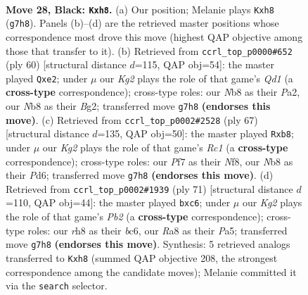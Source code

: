 \documentclass[11pt]{article}
\begin{document}
\clearpage

\begin{figure}[p]\centering
\begin{subfigure}{0.46\textwidth}\centering
\resizebox{\linewidth}{!}{%
\newchessgame
\chessboard[
  setfen={rn5R/pR1n1pk1/3p4/q2P2b1/4P1P1/2NQ4/4N3/4K3 b - - 0 28},
  showmover=false,
  pgfstyle=straightmove, color=movearrow, markmove={g7-h8}
]}
\caption{}
\end{subfigure}\hfill
\begin{subfigure}{0.46\textwidth}\centering
\resizebox{\linewidth}{!}{%
\newchessgame
\chessboard[
  setfen={3n4/p3q1kp/1p2npp1/8/4NP2/4P1P1/P3r1BP/3Q2K1 w - - 0 31},
  showmover=false,
  pgfstyle=straightmove, color=movearrow, markmove={d1-e2}
]}
\caption{}
\end{subfigure}
\\[4pt]
\begin{subfigure}{0.46\textwidth}\centering
\resizebox{\linewidth}{!}{%
\newchessgame
\chessboard[
  setfen={1Rr2nk1/7p/3p1b2/8/3Pp1p1/3qB1P1/4NP2/4RQK1 b - - 0 34},
  showmover=false,
  pgfstyle=straightmove, color=movearrow, markmove={c8-b8}
]}
\caption{}
\end{subfigure}\hfill
\begin{subfigure}{0.46\textwidth}\centering
\resizebox{\linewidth}{!}{%
\newchessgame
\chessboard[
  setfen={8/kp5q/2B2p2/p1n2P2/1bRN2P1/4P2r/1P6/1K1Q4 b - - 0 36},
  showmover=false,
  pgfstyle=straightmove, color=movearrow, markmove={b7-c6}
]}
\caption{}
\end{subfigure}
\caption{\textbf{Move 28, Black: \texttt{Kxh8}.} (a) Our position; Melanie plays \texttt{Kxh8} (\texttt{g7h8}). Panels (b)--(d) are the retrieved master positions whose correspondence most drove this move (highest QAP objective among those that transfer to it). (b) Retrieved from \texttt{ccrl\_top\_p0000\#652} (ply 60) [structural distance $d$=115, QAP obj=54]: the master played \texttt{Qxe2}; under $\mu$ our \emph{Kg2} plays the role of that game's \emph{Qd1} (a \textbf{cross-type} correspondence); cross-type roles: our \emph{N}b8 as their \emph{P}a2, our \emph{N}b8 as their \emph{B}g2; transferred move \texttt{g7h8} \textbf{(endorses this move)}. (c) Retrieved from \texttt{ccrl\_top\_p0002\#2528} (ply 67) [structural distance $d$=135, QAP obj=50]: the master played \texttt{Rxb8}; under $\mu$ our \emph{Kg2} plays the role of that game's \emph{Rc1} (a \textbf{cross-type} correspondence); cross-type roles: our \emph{P}f7 as their \emph{N}f8, our \emph{N}b8 as their \emph{P}d6; transferred move \texttt{g7h8} \textbf{(endorses this move)}. (d) Retrieved from \texttt{ccrl\_top\_p0002\#1939} (ply 71) [structural distance $d$=110, QAP obj=44]: the master played \texttt{bxc6}; under $\mu$ our \emph{Kg2} plays the role of that game's \emph{Pb2} (a \textbf{cross-type} correspondence); cross-type roles: our \emph{r}h8 as their \emph{b}c6, our \emph{R}a8 as their \emph{P}a5; transferred move \texttt{g7h8} \textbf{(endorses this move)}. Synthesis: 5 retrieved analogs transferred to \texttt{Kxh8} (summed QAP objective 208, the strongest correspondence among the candidate moves); Melanie committed it via the \texttt{search} selector.}
\label{fig:thought-m55}
\end{figure}
\end{document}

